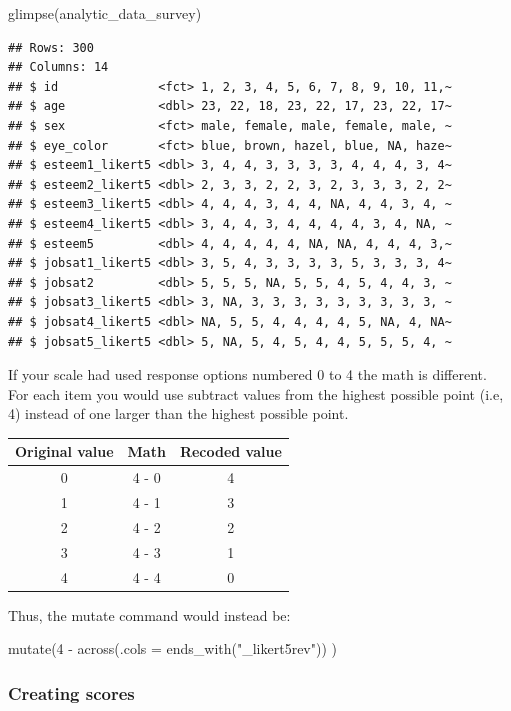 \documentclass[
]{krantz}
\makeatletter
\newenvironment{Shaded}{\begin{snugshade}}{\end{snugshade}}
\newcommand{\FunctionTok}[1]{\textcolor[rgb]{0,0,0}{#1}}
\newcommand{\NormalTok}[1]{#1}
\newenvironment{kframe}{%
\medskip{}
\setlength{\fboxsep}{.8em}
 \def\at@end@of@kframe{}%
 \ifinner\ifhmode%
  \def\at@end@of@kframe{\end{minipage}}%
  \begin{minipage}{\columnwidth}%
 \fi\fi%
 \def\FrameCommand##1{\hskip\@totalleftmargin \hskip-\fboxsep
 \colorbox{shadecolor}{##1}\hskip-\fboxsep
     \hskip-\linewidth \hskip-\@totalleftmargin \hskip\columnwidth}%
 \MakeFramed {\advance\hsize-\width
   \@totalleftmargin\z@ \linewidth\hsize
   \@setminipage}}%
 {\par\unskip\endMakeFramed%
 \at@end@of@kframe}
\newenvironment{rmdblock}[1]
  {
  \begin{itemize}
  \renewcommand{\labelitemi}{
    \raisebox{-.7\height}[0pt][0pt]{
      {\setkeys{Gin}{width=3em,keepaspectratio}\texttt{[image: images/\#1]}}
    }
  }
  \setlength{\fboxsep}{1em}
  \begin{kframe}
  \item
  }
  {
  \end{kframe}
  \end{itemize}
  }
\newenvironment{rmdcaution}
  {\begin{rmdblock}{caution}}
  {\end{rmdblock}}
\renewenvironment{Shaded}{\begin{kframe}}{\end{kframe}}
\makeatother
\begin{document}
\begin{Shaded}
\begin{Highlighting}[]
\FunctionTok{glimpse}\NormalTok{(analytic\_data\_survey)}
\end{Highlighting}
\end{Shaded}

\begin{verbatim}
## Rows: 300
## Columns: 14
## $ id              <fct> 1, 2, 3, 4, 5, 6, 7, 8, 9, 10, 11,~
## $ age             <dbl> 23, 22, 18, 23, 22, 17, 23, 22, 17~
## $ sex             <fct> male, female, male, female, male, ~
## $ eye_color       <fct> blue, brown, hazel, blue, NA, haze~
## $ esteem1_likert5 <dbl> 3, 4, 4, 3, 3, 3, 3, 4, 4, 4, 3, 4~
## $ esteem2_likert5 <dbl> 2, 3, 3, 2, 2, 3, 2, 3, 3, 3, 2, 2~
## $ esteem3_likert5 <dbl> 4, 4, 4, 3, 4, 4, NA, 4, 4, 3, 4, ~
## $ esteem4_likert5 <dbl> 3, 4, 4, 3, 4, 4, 4, 4, 3, 4, NA, ~
## $ esteem5         <dbl> 4, 4, 4, 4, 4, NA, NA, 4, 4, 4, 3,~
## $ jobsat1_likert5 <dbl> 3, 5, 4, 3, 3, 3, 3, 5, 3, 3, 3, 4~
## $ jobsat2         <dbl> 5, 5, 5, NA, 5, 5, 4, 5, 4, 4, 3, ~
## $ jobsat3_likert5 <dbl> 3, NA, 3, 3, 3, 3, 3, 3, 3, 3, 3, ~
## $ jobsat4_likert5 <dbl> NA, 5, 5, 4, 4, 4, 4, 5, NA, 4, NA~
## $ jobsat5_likert5 <dbl> 5, NA, 5, 4, 5, 4, 4, 5, 5, 5, 4, ~
\end{verbatim}

\begin{rmdcaution}
If your scale had used response options numbered 0 to 4 the math is different.
For each item you would use subtract values from the highest possible point (i.e, 4) instead of one larger than the highest possible point.

\begin{longtable}[]{@{}ccc@{}}
\toprule
Original value & Math & Recoded value \\
\midrule
\endhead
0 & 4 - 0 & 4 \\
1 & 4 - 1 & 3 \\
2 & 4 - 2 & 2 \\
3 & 4 - 3 & 1 \\
4 & 4 - 4 & 0 \\
\bottomrule
\end{longtable}

Thus, the mutate command would instead be:

mutate(4 - across(.cols = ends\_with("\_likert5rev")) )
\end{rmdcaution}

\hypertarget{creating-scores}{%
\subsubsection{Creating scores}\label{creating-scores}}
\end{document}
